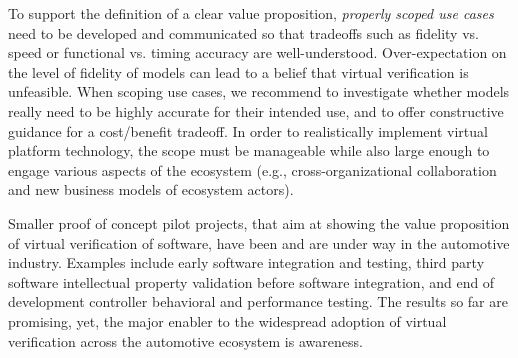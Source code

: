 To support the definition of a clear value proposition, \emph{properly scoped use cases} need to be developed and communicated so that tradeoffs such as fidelity vs. speed or functional vs. timing accuracy are well-understood.
Over-expectation on the level of fidelity of models can lead to a belief that virtual verification is unfeasible.
When scoping use cases, we recommend to investigate whether models really need to be highly accurate for their intended use, and to offer constructive guidance for a cost/benefit tradeoff.
In order to realistically implement virtual platform technology, the scope must be manageable while also large enough to engage various aspects of the ecosystem (e.g., cross-organizational collaboration and new business models of ecosystem actors).


Smaller proof of concept pilot projects, that aim at showing the value proposition of virtual verification of software, have been and are under way in the automotive industry.
Examples include early software integration and testing, third party software intellectual property validation before software integration, and end of development controller behavioral and performance testing.
The results so far are promising, yet, the major enabler to the widespread adoption of virtual verification across the automotive ecosystem is awareness.

